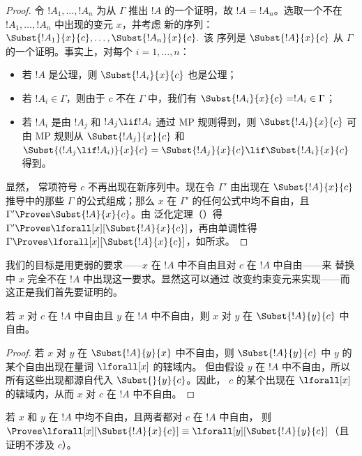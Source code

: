 \documentclass[../../../include/open-logic-section]{subfiles}
\begin{document}
\begin{proof} 令 $!A_1,\ldots,!A_n$ 为从 $\Gamma$ 推出 $!A$ 的一个证明，故
$!A=!A_n$。选取一个不在 $!A_1,\ldots,!A_n$ 中出现的变元 $x$，并考虑
新的序列：$\Subst{!A_1}{x}{c},\ldots,\Subst{!A_n}{x}{c}.$ 该
序列是 $\Subst{!A}{x}{c}$ 从 $\Gamma$ 的一个证明。事实上，对每个
$i=1,\ldots,n$： \begin{itemize} \item 若 $!A$ 是公理，则 $\Subst{!A_i}{x}{c}$ 也是公理； \item 若 $!A_i \in \Gamma$，则由于 $c$ 不在
$\Gamma$ 中，我们有 $\Subst{!A_i}{x}{c} = !A_i \in \Gamma$； \item 若 $!A_i$
是由 $!A_j$ 和 $!A_j \lif !A_i$ 通过 MP 规则得到，则 $\Subst{!A_i}{x}{c}$
可由 MP 规则从 $\Subst{!A_j}{x}{c}$ 和 $\Subst{(!A_j \lif !A_i)}{x}{c}
= \Subst{!A_j}{x}{c} \lif \Subst{!A_i}{x}{c}$ 得到。\end{itemize} 显然，
常项符号 $c$ 不再出现在新序列中。现在令
$\Gamma'$ 由出现在 $\Subst{!A}{x}{c}$ 推导中的那些 $\Gamma$ 的公式组成；那么 $x$ 在 $\Gamma'$
的任何公式中均不自由，且 $\Gamma' \Proves \Subst{!A}{x}{c}$。由
泛化定理（）得 $\Gamma'
\Proves \lforall[x][\Subst{!A}{x}{c}]$，再由单调性得 $\Gamma \Proves
\lforall[x][\Subst{!A}{x}{c}]$，如所求。
\end{proof}

\begin{explain}
我们的目标是用更弱的要求——$x$ 在 $!A$ 中不自由且对 $c$ 在 $!A$ 中自由——来
替换  中 $x$ 完全不在 $!A$ 中出现这一要求。显然这可以通过
改变约束变元来实现——而这正是我们首先要证明的。
\end{explain}

\begin{lem}
若 $x$ 对 $c$ 在 $!A$ 中自由且 $y$ 在 $!A$ 中不自由，则 $x$
对 $y$ 在 $\Subst{!A}{y}{c}$ 中自由。
\end{lem}

\begin{proof} 若 $x$ 对 $y$ 在 $\Subst{!A}{y}{x}$ 中不自由，则
$\Subst{!A}{y}{c}$ 中 $y$ 的某个自由出现在量词 $\lforall[x]$ 的辖域内。
但由假设 $y$ 在 $!A$ 中不自由，所以所有这些出现都源自代入 $\Subst{}{y}{c}$。因此，
$c$ 的某个出现在 $\lforall[x]$ 的辖域内，从而 $x$ 对 $c$ 在 $!A$ 中不自由。
\end{proof}

\begin{lem}[改变约束变元]
若 $x$ 和 $y$ 在 $!A$ 中均不自由，且两者都对 $c$ 在 $!A$ 中自由，
则 $\Proves \lforall[x][\Subst{!A}{x}{c}] \equiv
\lforall[y][\Subst{!A}{y}{c}]$（且证明不涉及 $c$）。
\end{lem}
\end{document}
